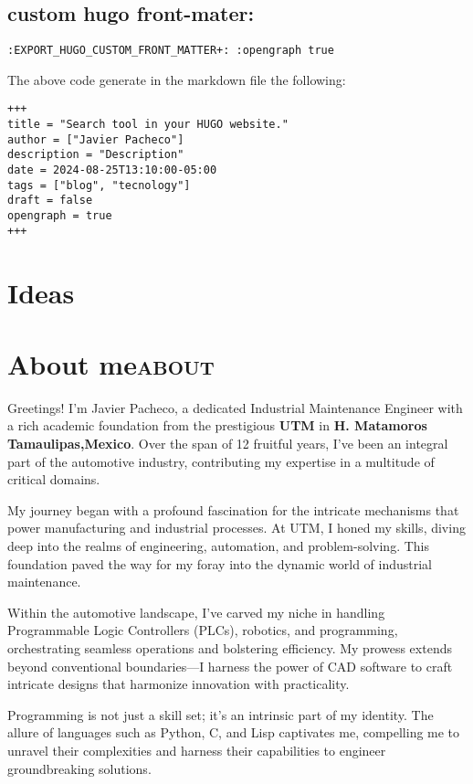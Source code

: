 \documentclass[11pt]{article}
\begin{document}
\subsection{custom hugo front-mater:}
\label{sec:org7a2c85a}
\begin{verbatim}
:EXPORT_HUGO_CUSTOM_FRONT_MATTER+: :opengraph true
\end{verbatim}
The above code generate in the markdown file the following:
\begin{verbatim}
+++
title = "Search tool in your HUGO website."
author = ["Javier Pacheco"]
description = "Description"
date = 2024-08-25T13:10:00-05:00
tags = ["blog", "tecnology"]
draft = false
opengraph = true
+++
\end{verbatim}
\section{Ideas}
\label{sec:orgef0c51f}
\section{About me\hfill{}\textsc{about}}
\label{sec:orga7496fc}
Greetings! I'm Javier Pacheco, a dedicated Industrial Maintenance Engineer with a rich academic foundation from the prestigious \textbf{UTM} in \textbf{H. Matamoros Tamaulipas,Mexico}. Over the span of 12 fruitful years, I've been an integral part of the automotive industry, contributing my expertise in a multitude of critical domains.

My journey began with a profound fascination for the intricate mechanisms that power manufacturing and industrial processes. At UTM, I honed my skills, diving deep into the realms of engineering, automation, and problem-solving. This foundation paved the way for my foray into the dynamic world of industrial maintenance.

Within the automotive landscape, I've carved my niche in handling Programmable Logic Controllers (PLCs), robotics, and programming, orchestrating seamless operations and bolstering efficiency. My prowess extends beyond conventional boundaries—I harness the power of CAD software to craft intricate designs that harmonize innovation with practicality.

Programming is not just a skill set; it's an intrinsic part of my identity. The allure of languages such as Python, C, and Lisp captivates me, compelling me to unravel their complexities and harness their capabilities to engineer groundbreaking solutions.
\end{document}
